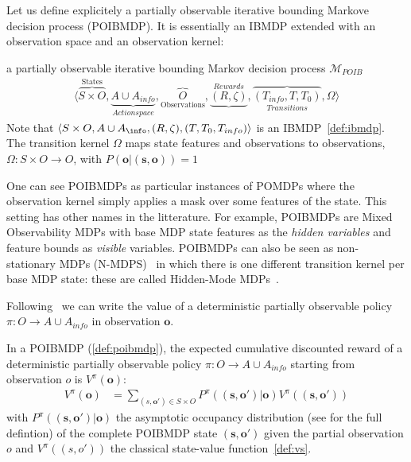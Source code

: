 Let us define explicitely a partially observable iterative bounding Markove decision process (POIBMDP). It is essentially an IBMDP extended with an observation space and an observation kernel:
\begin{definition}\label{def:poibmdp} a partially observable iterative bounding Markov decision process $\mathcal{M}_{POIB}$
    \begin{align*}
        \langle \overbrace{S\times O}^{\text{States}}, \underbrace{A\cup A_{info}}_{Action space},\overbrace{O}_{\text{Observations}} ,\underbrace{(R, \zeta)}^{Rewards}, \overbrace{(T_{info}, T, T_0)}_{Transitions}, \Omega \rangle
    \end{align*}
    Note that $\langle S\times O, A\cup A_{\info}, (R, \zeta),( T, T_0, T_{info})\rangle$ is an IBMDP~\ref{def:ibmdp}.
    The transition kernel $\Omega$ maps state features and observations to observations, $\Omega:S\times O \rightarrow O$, with $P(\boldsymbol{o}|(\boldsymbol{s}, \boldsymbol{o}))=1$ 
\end{definition}

One can see POIBMDPs as particular instances of POMDPs where the observation kernel simply applies a mask over some features of the state.
This setting has other names in the litterature.
For example, POIBMDPs are Mixed Observability MDPs \cite{momdp} with base MDP state features as the \textit{hidden variables} and feature bounds as \textit{visible} variables.
POIBMDPs can also be seen as non-stationary MDPs (N-MDPS)~\cite{learning-pomdp} in which there is one different transition kernel per base MDP state: these are called Hidden-Mode MDPs~\cite{hmmdp}. 

Following~\cite{learning-pomdp} we can write the value of a deterministic partially observable policy $\pi:O\rightarrow A\cup A_{info}$ in observation $\boldsymbol{o}$.

\begin{definition}\label{def:vpo} In a POIBMDP (\ref{def:poibmdp}), the expected cumulative discounted reward of a deterministic partially observable policy $\pi:O\rightarrow A\cup A_{info}$ starting from observation $o$ is $V^{\pi}(\boldsymbol{o})$:
    \begin{align*}
        V^{\pi}(\boldsymbol{o}) &= \underset{(s,\boldsymbol{o}')\in S\times O}{\sum}P^{\pi}((\boldsymbol{s}, \boldsymbol{o}')|\boldsymbol{o})V^{\pi}((\boldsymbol{s}, \boldsymbol{o}'))
    \end{align*}
with $P^{\pi}((\boldsymbol{s}, \boldsymbol{o}')|\boldsymbol{o})$ the asymptotic occupancy distribution (see \cite[section 4]{learning-pomdp} for the full defintion) of the complete POIBMDP state $(\boldsymbol{s},\boldsymbol{o}')$ given the partial observation $o$ and $V^{\pi}((s, o'))$ the classical state-value function~\ref{def:vs}.
\end{definition}


